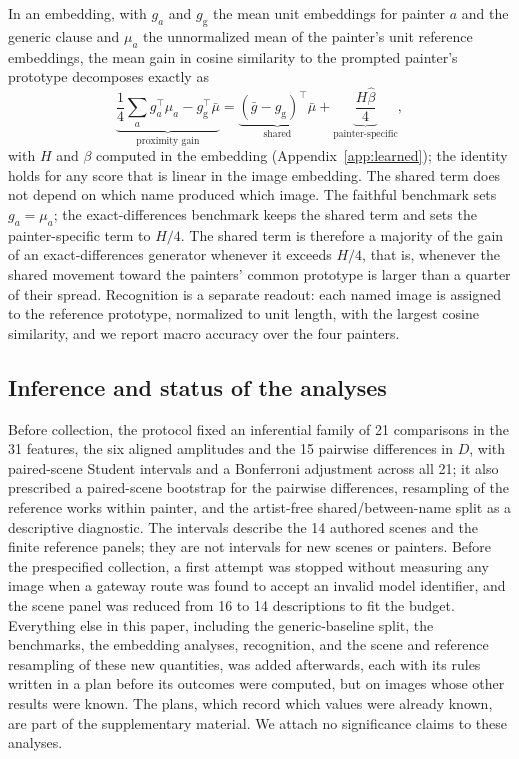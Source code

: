 \documentclass[10pt]{article}
\begin{document}
In an embedding, with $g_a$ and $g_{\mathrm{g}}$ the mean unit embeddings for painter $a$ and the
generic clause and $\mu_a$ the unnormalized mean of the painter's unit reference embeddings, the
mean gain in cosine similarity to the prompted painter's prototype decomposes exactly as
\begin{equation}
\underbrace{\frac14\sum_a g_a^\top\mu_a-g_{\mathrm{g}}^\top\bar\mu}_{\text{proximity gain}}
=\underbrace{(\bar g-g_{\mathrm{g}})^\top\bar\mu}_{\text{shared}}
+\underbrace{\frac{H\widehat\beta}{4}}_{\text{painter-specific}},
\label{eq:prototype-gain}
\end{equation}
with $H$ and $\beta$ computed in the embedding (Appendix~\ref{app:learned}); the identity holds for
any score that is linear in the image embedding. The shared term does not depend on which name
produced which image. The faithful benchmark sets $g_a=\mu_a$; the exact-differences benchmark
keeps the shared term and sets the painter-specific term to $H/4$. The shared term is therefore a
majority of the gain of an exact-differences generator whenever it exceeds $H/4$, that is,
whenever the shared movement toward the painters' common prototype is larger than a quarter of
their spread. Recognition is a separate readout: each named image is assigned to the reference
prototype, normalized to unit length, with the largest cosine similarity, and we report macro
accuracy over the four painters.

\subsection{Inference and status of the analyses}\label{sec:inference}

Before collection, the protocol fixed an inferential family of 21 comparisons in the 31 features,
the six aligned amplitudes and the 15 pairwise differences in $D$, with paired-scene Student
intervals and a Bonferroni adjustment across all 21; it also prescribed a paired-scene bootstrap
for the pairwise differences, resampling of the reference works within painter, and the
artist-free shared/between-name split as a descriptive diagnostic. The intervals describe the 14
authored scenes and the finite reference panels; they are not intervals for new scenes or
painters. Before the prespecified collection, a first attempt was stopped without measuring any
image when a gateway route was found to accept an invalid model identifier, and the scene panel
was reduced from 16 to 14 descriptions to fit the budget. Everything else in this paper, including
the generic-baseline split, the benchmarks, the embedding analyses, recognition, and the scene and
reference resampling of these new quantities, was added afterwards, each with its rules written in
a plan before its outcomes were computed, but on images whose other results were known. The plans,
which record which values were already known, are part of the supplementary material. We attach no
significance claims to these analyses.
\end{document}

